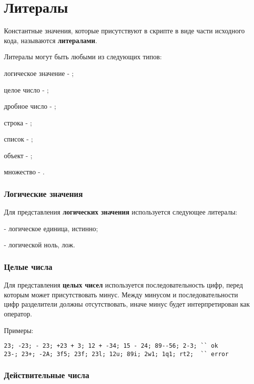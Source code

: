\section{Литералы}

Константные значения, которые присутствуют в скрипте в виде части исходного кода, называются {\bf литералами}.

Литералы могут быть любыми из следующих типов:

\begin{icItems}
	\item
		логическое значение - \bool{};
	\item
		целое число - \integer{};
	\item
		дробное число - \double{};
	\item
		строка - \str{};
	\item
		список - \listtype{};
	\item
		объект - \object{};
	\item
		множество - \set{}.
\end{icItems}

\subsubsection{Логические значения}

Для представления {\bf логических значения} используется следующее литералы:
\begin{icItems}
	\item \true{} - логическое единица, истинно;
	\item \false{} - логической ноль, лож.
\end{icItems}

\subsubsection{Целые числа}

Для представления {\bf целых чисел} используется последовательность цифр, перед которым может присутствовать минус. Между минусом и последовательности цифр разделители должны отсутствовать, иначе минус будет интерпретирован как оператор.

\noindent Примеры:
\begin{verbatim}
23; -23; - 23; +23 + 3; 12 + -34; 15 - 24; 89--56; 2-3; `` ok
23-; 23+; -2А; 3f5; 23f; 23l; 12u; 89i; 2w1; 1q1; rt2;  `` error
\end{verbatim}

\subsubsection{Действительные числа}

